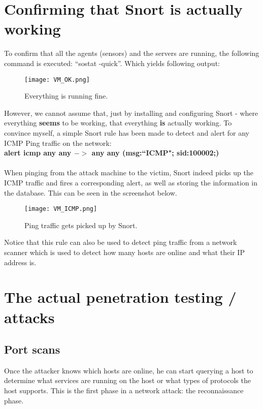 \section{Confirming that Snort is actually working}

To confirm that all the agents (sensors) and the servers are running, the following command is executed: ``sostat -quick''. Which yields following output:

\begin{figure}[h]
    \centering
    \texttt{[image: VM\_OK.png]}
    \caption{Everything is running fine.}
\end{figure}


However, we cannot assume that, just by installing and configuring Snort - where everything \textbf{seems} to be working, that everything \textbf{is} actually working. To convince myself, a simple Snort rule has been made to detect and alert for any ICMP Ping traffic on the network: \\

\textbf{alert icmp any any $->$ any any (msg:``ICMP"; sid:100002;)} \\ \\
When pinging from the attack machine to the victim, Snort indeed picks up the ICMP traffic and fires a corresponding alert, as well as storing the information in the database. This can be seen in the screenshot below.

\begin{figure}[htb]
    \centering
    \texttt{[image: VM\_ICMP.png]}
    \caption{Ping traffic gets picked up by Snort.}
\end{figure}

Notice that this rule can also be used to detect ping traffic from a network scanner which is used to detect how many hosts are online and what their IP address is.

\section{The actual penetration testing / attacks}

\subsection{Port scans}

Once the attacker knows which hosts are online, he can start querying a host to determine what services are running on the host or what types of protocols the host supports. This is the first phase in a network attack: the reconnaissance phase. 

